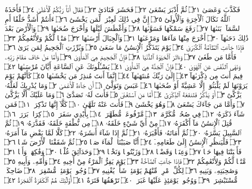 فَكَذَّبَ وَعَصَىٰ ۝٢١ ثُمَّ أَدْبَرَ يَسْعَىٰ ۝٢٢ فَحَشَرَ فَنَادَىٰ ۝٢٣
فَقَالَ أَنَا۠ رَبُّكُمُ ٱلْأَعْلَىٰ ۝٢٤ فَأَخَذَهُ ٱللَّهُ نَكَالَ ٱلْأٓخِرَةِ وَٱلْأُولَىٰٓ ۝٢٥
إِنَّ فِي ذَٰلِكَ لَعِبْرَةࣰ لِّمَن يَخْشَىٰٓ ۝٢٦ ءَأَنتُمْ أَشَدُّ خَلْقًا أَمِ ٱلسَّمَآءُۚ
بَنَىٰهَا ۝٢٧ رَفَعَ سَمْكَهَا فَسَوَّىٰهَا ۝٢٨ وَأَغْطَشَ لَيْلَهَا وَأَخْرَجَ
ضُحَىٰهَا ۝٢٩ وَٱلْأَرْضَ بَعْدَ ذَٰلِكَ دَحَىٰهَآ ۝٣٠ أَخْرَجَ مِنْهَا مَآءَهَا
وَمَرْعَىٰهَا ۝٣١ وَٱلْجِبَالَ أَرْسَىٰهَا ۝٣٢ مَتَٰعࣰا لَّكُمْ وَلِأَنْعَٰمِكُمْ ۝٣٣
فَإِذَا جَآءَتِ ٱلطَّآمَّةُ ٱلْكُبْرَىٰ ۝٣٤ يَوْمَ يَتَذَكَّرُ ٱلْإِنسَٰنُ مَا سَعَىٰ ۝٣٥
وَبُرِّزَتِ ٱلْجَحِيمُ لِمَن يَرَىٰ ۝٣٦ فَأَمَّا مَن طَغَىٰ ۝٣٧ وَءَاثَرَ ٱلْحَيَوٰةَ
ٱلدُّنْيَا ۝٣٨ فَإِنَّ ٱلْجَحِيمَ هِيَ ٱلْمَأْوَىٰ ۝٣٩ وَأَمَّا مَنْ خَافَ مَقَامَ
رَبِّهِۦ وَنَهَى ٱلنَّفْسَ عَنِ ٱلْهَوَىٰ ۝٤٠ فَإِنَّ ٱلْجَنَّةَ هِيَ ٱلْمَأْوَىٰ ۝٤١
يَسْـَٔلُونَكَ عَنِ ٱلسَّاعَةِ أَيَّانَ مُرْسَىٰهَا ۝٤٢ فِيمَ أَنتَ مِن
ذِكْرَىٰهَآ ۝٤٣ إِلَىٰ رَبِّكَ مُنتَهَىٰهَآ ۝٤٤ إِنَّمَآ أَنتَ مُنذِرُ مَن يَخْشَىٰهَا ۝٤٥
كَأَنَّهُمْ يَوْمَ يَرَوْنَهَا لَمْ يَلْبَثُوٓا۟ إِلَّا عَشِيَّةً أَوْ ضُحَىٰهَا ۝٤٦
عَبَسَ وَتَوَلَّىٰٓ ۝١ أَن جَآءَهُ ٱلْأَعْمَىٰ ۝٢ وَمَا يُدْرِيكَ لَعَلَّهُۥ يَزَّكَّىٰٓ ۝٣ أَوْ يَذَّكَّرُ
فَتَنفَعَهُ ٱلذِّكْرَىٰٓ ۝٤ أَمَّا مَنِ ٱسْتَغْنَىٰ ۝٥ فَأَنتَ لَهُۥ تَصَدَّىٰ ۝٦ وَمَا عَلَيْكَ
أَلَّا يَزَّكَّىٰ ۝٧ وَأَمَّا مَن جَآءَكَ يَسْعَىٰ ۝٨ وَهُوَ يَخْشَىٰ ۝٩ فَأَنتَ عَنْهُ تَلَهَّىٰ ۝١٠
كَلَّآ إِنَّهَا تَذْكِرَةࣱ ۝١١ فَمَن شَآءَ ذَكَرَهُۥ ۝١٢ فِي صُحُفࣲ مُّكَرَّمَةࣲ ۝١٣ مَّرْفُوعَةࣲ
مُّطَهَّرَةِۭ ۝١٤ بِأَيْدِي سَفَرَةࣲ ۝١٥ كِرَامِۭ بَرَرَةࣲ ۝١٦ قُتِلَ ٱلْإِنسَٰنُ مَآ أَكْفَرَهُۥ ۝١٧ مِنْ
أَيِّ شَيْءٍ خَلَقَهُۥ ۝١٨ مِن نُّطْفَةٍ خَلَقَهُۥ فَقَدَّرَهُۥ ۝١٩ ثُمَّ ٱلسَّبِيلَ يَسَّرَهُۥ ۝٢٠
ثُمَّ أَمَاتَهُۥ فَأَقْبَرَهُۥ ۝٢١ ثُمَّ إِذَا شَآءَ أَنشَرَهُۥ ۝٢٢ كَلَّا لَمَّا يَقْضِ مَآ أَمَرَهُۥ ۝٢٣
فَلْيَنظُرِ ٱلْإِنسَٰنُ إِلَىٰ طَعَامِهِۦٓ ۝٢٤ أَنَّا صَبَبْنَا ٱلْمَآءَ صَبࣰّا ۝٢٥ ثُمَّ شَقَقْنَا
ٱلْأَرْضَ شَقࣰّا ۝٢٦ فَأَنۢبَتْنَا فِيهَا حَبࣰّا ۝٢٧ وَعِنَبࣰا وَقَضْبࣰا ۝٢٨ وَزَيْتُونࣰا وَنَخْلࣰا ۝٢٩
وَحَدَآئِقَ غُلْبࣰا ۝٣٠ وَفَٰكِهَةࣰ وَأَبࣰّا ۝٣١ مَّتَٰعࣰا لَّكُمْ وَلِأَنْعَٰمِكُمْ ۝٣٢ فَإِذَا جَآءَتِ
ٱلصَّآخَّةُ ۝٣٣ يَوْمَ يَفِرُّ ٱلْمَرْءُ مِنْ أَخِيهِ ۝٣٤ وَأُمِّهِۦ وَأَبِيهِ ۝٣٥ وَصَٰحِبَتِهِۦ
وَبَنِيهِ ۝٣٦ لِكُلِّ ٱمْرِئࣲ مِّنْهُمْ يَوْمَئِذࣲ شَأْنࣱ يُغْنِيهِ ۝٣٧ وُجُوهࣱ يَوْمَئِذࣲ
مُّسْفِرَةࣱ ۝٣٨ ضَاحِكَةࣱ مُّسْتَبْشِرَةࣱ ۝٣٩ وَوُجُوهࣱ يَوْمَئِذٍ عَلَيْهَا غَبَرَةࣱ ۝٤٠
تَرْهَقُهَا قَتَرَةٌ ۝٤١ أُو۟لَٰٓئِكَ هُمُ ٱلْكَفَرَةُ ٱلْفَجَرَةُ ۝٤٢
